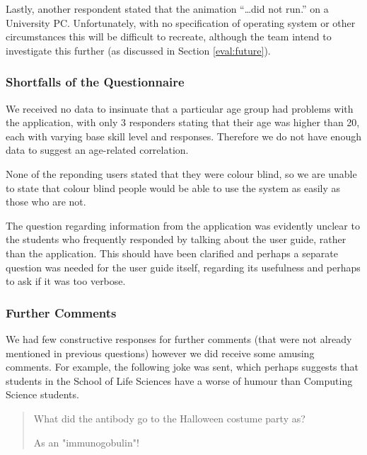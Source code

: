 Lastly, another respondent stated that the animation ``\ldots did not
run.'' on a University PC.
Unfortunately, with no specification of operating system or other
circumstances this will be difficult to recreate, although the team
intend to investigate this further (as discussed in Section
\ref{eval:future}).

\subsubsection{Shortfalls of the Questionnaire}
We received no data to insinuate that a particular age group had
problems with the application, with only 3 responders stating that
their age was higher than 20, each with varying base skill level and
responses.
Therefore we do not have enough data to suggest an age-related
correlation.

None of the reponding users stated that they were colour blind, so we
are unable to state that colour blind people would be able to use the
system as easily as those who are not.

The question regarding information from the application was evidently
unclear to the students who frequently responded by talking about the
user guide, rather than the application.
This should have been clarified and perhaps a separate question was
needed for the user guide itself, regarding its usefulness and perhaps
to ask if it was too verbose.

\subsubsection{Further Comments}

We had few constructive responses for further comments (that were not
already mentioned in previous questions) however we did receive some
amusing comments.
For example, the following joke was sent, which perhaps suggests that
students in the School of Life Sciences have a worse of humour than
Computing Science students.
\begin{quote}
What did the antibody go to the Halloween costume party as?

As an "immunogobulin"!
\end{quote}


